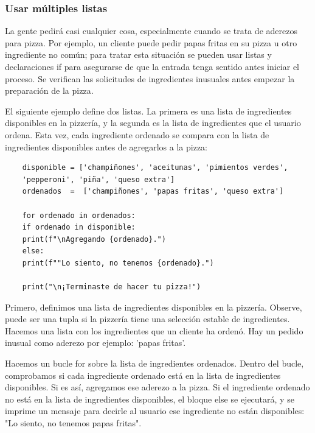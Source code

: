 \subsubsection{Usar múltiples listas}

La gente pedirá casi cualquier cosa, especialmente cuando se trata de aderezos para pizza.
Por ejemplo, un cliente  puede pedir papas fritas en su pizza u otro ingrediente no común;  para tratar esta situación se pueden usar listas y declaraciones {\ttfamily if} para asegurarse de que la entrada tenga sentido antes iniciar el proceso. Se verifican las solicitudes de ingredientes inusuales antes empezar la  preparación de la pizza.

El siguiente ejemplo define dos listas. La primera es una lista de ingredientes disponibles en 
la pizzería, y la segunda es la lista de ingredientes que el usuario ordena.
Esta vez, cada ingrediente ordenado se compara con la lista de ingredientes disponibles antes de agregarlos a la pizza:

\hspace{-2.7cm}{\ttfamily \scriptsize inusuales.py}\vspace{-0.55cm}
\begin{lstlisting}
	disponible = ['champiñones', 'aceitunas', 'pimientos verdes',
	'pepperoni', 'piña', 'queso extra']
	ordenados  =  ['champiñones', 'papas fritas', 'queso extra']
	
	for ordenado in ordenados:
	if ordenado in disponible:
	print(f"\nAgregando {ordenado}.")
	else:
	print(f""Lo siento, no tenemos {ordenado}.")
	
	print("\n¡Terminaste de hacer tu pizza!") 
\end{lstlisting}

Primero, definimos una lista de ingredientes disponibles en la pizzería. Observe,  puede ser una tupla si la pizzería tiene una selección estable de ingredientes. Hacemos una lista con los ingredientes que un cliente ha ordenó. 
Hay un pedido inusual como aderezo por ejemplo: 'papas fritas'. 

Hacemos un bucle {\ttfamily for} sobre la lista de ingredientes ordenados. Dentro del bucle, comprobamos si cada ingrediente ordenado está en la lista de ingredientes disponibles. Si es así, agregamos ese aderezo a la pizza. Si el ingrediente ordenado no está en la lista de ingredientes disponibles, el bloque {\ttfamily else} se ejecutará, y se imprime un mensaje para decirle al usuario ese ingrediente no están disponibles: "Lo siento, no tenemos papas fritas". 


